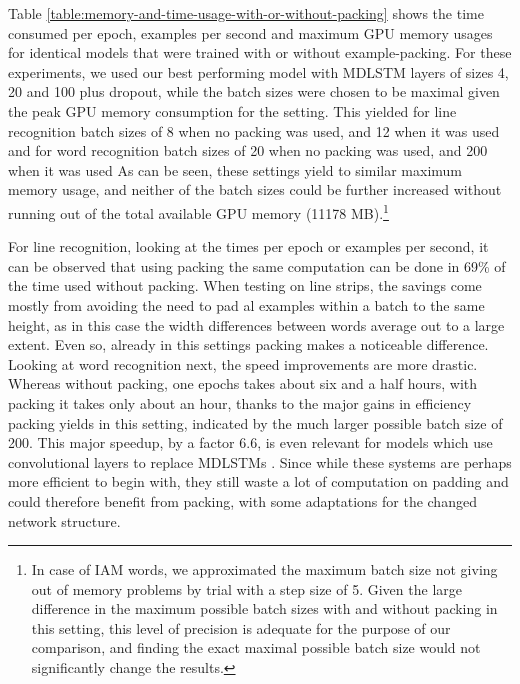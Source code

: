 \documentclass[conference]{IEEEtran}
\begin{document}
Table \ref{table:memory-and-time-usage-with-or-without-packing} shows the time consumed 
per epoch, examples per second and maximum GPU memory usages for identical models that 
were trained with or without example-packing. For these experiments, we used our best performing
model with MDLSTM layers of sizes 4, 20 and 100 plus dropout, while the batch 
sizes were chosen to be maximal given the peak GPU memory consumption for the setting. This yielded 
for line recognition batch sizes of 8 when no packing was used, and 12 when it was used and 
for word recognition batch sizes of 20 when no packing was used, and 200 when it was used 
As can be seen, these settings yield to similar maximum memory usage, and neither of the batch sizes could
be further increased without running out of the total available GPU memory (11178 MB).\footnote{In case of IAM words, we approximated the maximum batch size not giving out of memory problems by trial with a step size of 5. 
Given the large difference in the maximum possible batch sizes with and without packing in this setting, this level of precision is adequate for the purpose of our comparison, 
and finding the exact maximal possible batch size would not significantly change the results.}

For line recognition, looking at the times per epoch or  examples per second, it can be observed that using packing the same 
computation can be done in 69\% of the time used without packing. 
When testing on line strips, the savings come mostly from avoiding the need to pad 
al examples within a batch to the same height, as in this case the width differences between words average out to 
a large extent. Even so, already in this settings packing makes a noticeable difference.
Looking at word recognition next, the speed improvements are more drastic. Whereas without packing, one epochs takes about six and a half hours, 
with packing it takes only about an hour, thanks to the major gains in efficiency packing yields in this setting, indicated by the 
much larger possible batch size of 200. This major speedup, by a factor 6.6, is even relevant for models which use convolutional layers to 
replace MDLSTMs \cite{Puigcerver2017}. Since while these systems are perhaps more efficient to begin with, they still waste a lot of computation on padding 
and could therefore benefit from packing, with some adaptations for the changed network structure.
\end{document}
